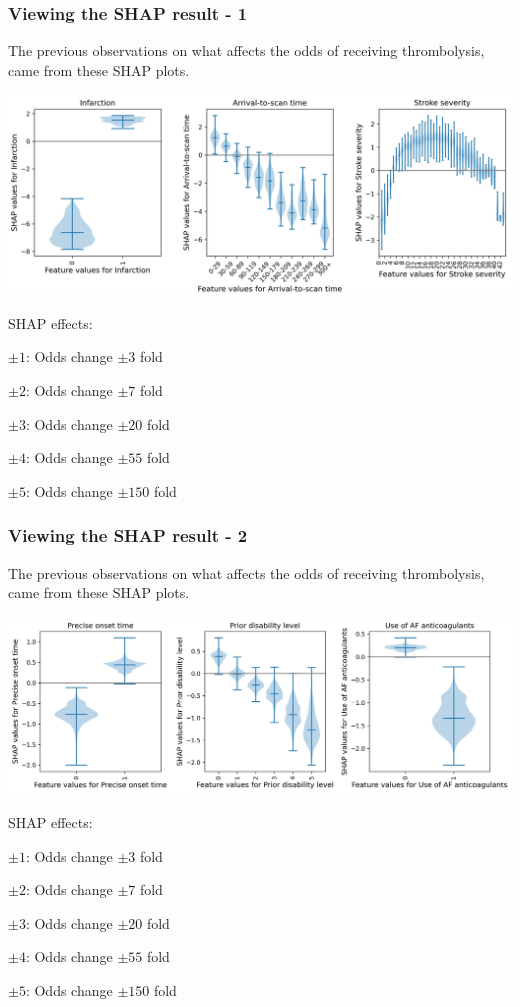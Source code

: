 \documentclass{beamer}
\begin{document}
\begin{frame}
\frametitle{Viewing the SHAP result - 1}
The previous observations on what affects the odds of receiving thrombolysis, came from these SHAP plots.
\begin{center}
\includegraphics[width=1.0\textwidth]{./images/shap_violin_1}
\end{center}

\scriptsize
SHAP effects: 

$\pm1$: Odds change $\pm3$ fold

$\pm2$: Odds change $\pm7$ fold

$\pm3$: Odds change $\pm20$ fold

$\pm4$: Odds change $\pm55$ fold

$\pm5$: Odds change $\pm150$ fold
    



\end{frame}

\begin{frame}
\frametitle{Viewing the SHAP result - 2}
The previous observations on what affects the odds of receiving thrombolysis, came from these SHAP plots.
\begin{center}
\includegraphics[width=1.0\textwidth]{./images/shap_violin_2}
\end{center}

\scriptsize
SHAP effects: 

$\pm1$: Odds change $\pm3$ fold

$\pm2$: Odds change $\pm7$ fold

$\pm3$: Odds change $\pm20$ fold

$\pm4$: Odds change $\pm55$ fold

$\pm5$: Odds change $\pm150$ fold
\end{frame}
\end{document}
